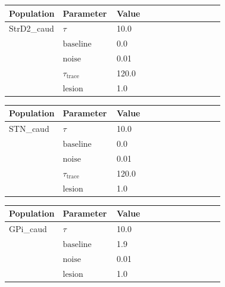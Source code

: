 \documentclass{article}
\begin{document}
\noindent
\begin{tabularx}{\linewidth}{|p{0.25\linewidth}|p{0.25\linewidth}|X|}\hline
\textbf{Population} & \textbf{Parameter} & \textbf{Value}   \\ \hline

    StrD2\_caud             & $\tau$        & 10.0  \\ \hline

                 & ${\text{baseline}}$        & 0.0  \\ \hline

                 & ${\text{noise}}$        & 0.01  \\ \hline

                 & $\tau_{\text{trace}}$        & 120.0  \\ \hline

                 & ${\text{lesion}}$        & 1.0  \\ \hline

\end{tabularx}

\vspace{2ex}

\noindent
\begin{tabularx}{\linewidth}{|p{0.25\linewidth}|p{0.25\linewidth}|X|}\hline
\textbf{Population} & \textbf{Parameter} & \textbf{Value}   \\ \hline

    STN\_caud             & $\tau$        & 10.0  \\ \hline

                 & ${\text{baseline}}$        & 0.0  \\ \hline

                 & ${\text{noise}}$        & 0.01  \\ \hline

                 & $\tau_{\text{trace}}$        & 120.0  \\ \hline

                 & ${\text{lesion}}$        & 1.0  \\ \hline

\end{tabularx}

\vspace{2ex}

\noindent
\begin{tabularx}{\linewidth}{|p{0.25\linewidth}|p{0.25\linewidth}|X|}\hline
\textbf{Population} & \textbf{Parameter} & \textbf{Value}   \\ \hline

    GPi\_caud             & $\tau$        & 10.0  \\ \hline

                 & ${\text{baseline}}$        & 1.9  \\ \hline

                 & ${\text{noise}}$        & 0.01  \\ \hline

                 & ${\text{lesion}}$        & 1.0  \\ \hline

\end{tabularx}
\end{document}
